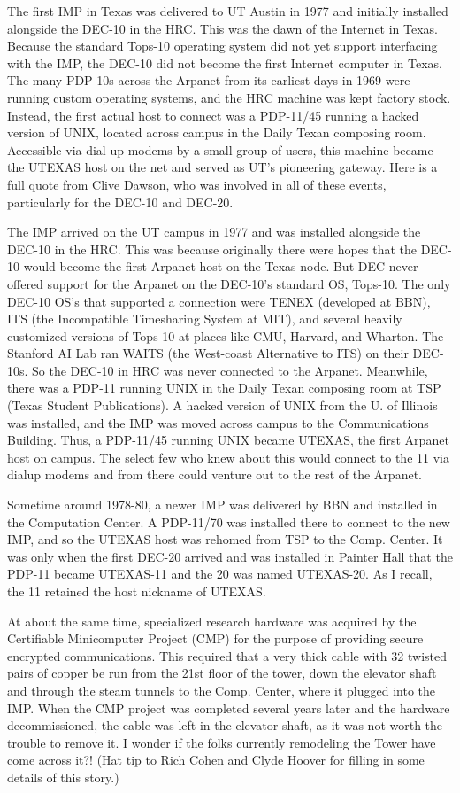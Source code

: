 The first IMP in Texas was delivered to UT Austin in 1977 and initially installed alongside the DEC-10 in the HRC. This was the dawn of the Internet in Texas. Because the standard Tops-10 operating system did not yet support interfacing with the IMP, the DEC-10 did not become the first Internet computer in Texas. The many PDP-10s across the Arpanet from its earliest days in 1969 were running custom operating systems, and the HRC machine was kept factory stock. Instead, the first actual host to connect was a PDP-11/45 running a hacked version of UNIX, located across campus in the Daily Texan composing room. Accessible via dial-up modems by a small group of users, this machine became the UTEXAS host on the net and served as UT's pioneering gateway. Here is a full quote from Clive Dawson, who was involved in all of these events, particularly for the DEC-10 and DEC-20.

The IMP arrived on the UT campus in 1977 and was installed alongside the DEC-10 in the HRC. This was because originally there were hopes that the DEC-10 would become the first Arpanet host on the Texas node. But DEC never offered support for the Arpanet on the DEC-10’s standard OS, Tops-10. The only DEC-10 OS's that supported a connection were TENEX (developed at BBN), ITS (the Incompatible Timesharing System at MIT), and several heavily customized versions of Tops-10 at places like CMU, Harvard, and Wharton. The Stanford AI Lab ran WAITS (the West-coast Alternative to ITS) on their DEC-10s. So the DEC-10 in HRC was never connected to the Arpanet. Meanwhile, there was a PDP-11 running UNIX in the Daily Texan composing room at TSP (Texas Student Publications). A hacked version of UNIX from the U. of Illinois was installed, and the IMP was moved across campus to the Communications Building. Thus, a PDP-11/45 running UNIX became UTEXAS, the first Arpanet host on campus. The select few who knew about this would connect to the 11 via dialup modems and from there could venture out to the rest of the Arpanet.

Sometime around 1978-80, a newer IMP was delivered by BBN and installed in the Computation Center. A PDP-11/70 was installed there to connect to the new IMP, and so the UTEXAS host was rehomed from TSP to the Comp. Center. It was only when the first DEC-20 arrived and was installed in Painter Hall that the PDP-11 became UTEXAS-11 and the 20 was named UTEXAS-20. As I recall, the 11 retained the host nickname of UTEXAS.

At about the same time, specialized research hardware was acquired by the Certifiable Minicomputer Project (CMP) for the purpose of providing secure encrypted communications. This required that a very thick cable with 32 twisted pairs of copper be run from the 21st floor of the tower, down the elevator shaft and through the steam tunnels to the Comp. Center, where it plugged into the IMP. When the CMP project was completed several years later and the hardware decommissioned, the cable was left in the elevator shaft, as it was not worth the trouble to remove it. I wonder if the folks currently remodeling the Tower have come across it?! (Hat tip to Rich Cohen and Clyde Hoover for filling in some details of this story.)

